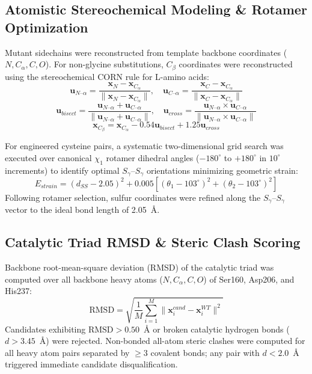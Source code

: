 \documentclass[journal=natcat,manuscript=article]{achemso}
\begin{document}
\subsection{Atomistic Stereochemical Modeling \& Rotamer Optimization}
Mutant sidechains were reconstructed from template backbone coordinates ($N, C_\alpha, C, O$). For non-glycine substitutions, $C_\beta$ coordinates were reconstructed using the stereochemical CORN rule for L-amino acids:
\begin{equation}
\mathbf{u}_{N\text{--}\alpha} = \frac{\mathbf{x}_N - \mathbf{x}_{C_\alpha}}{\|\mathbf{x}_N - \mathbf{x}_{C_\alpha}\|}, \quad \mathbf{u}_{C\text{--}\alpha} = \frac{\mathbf{x}_C - \mathbf{x}_{C_\alpha}}{\|\mathbf{x}_C - \mathbf{x}_{C_\alpha}\|}
\end{equation}
\begin{equation}
\mathbf{u}_{bisect} = \frac{\mathbf{u}_{N\text{--}\alpha} + \mathbf{u}_{C\text{--}\alpha}}{\|\mathbf{u}_{N\text{--}\alpha} + \mathbf{u}_{C\text{--}\alpha}\|}, \quad \mathbf{u}_{cross} = \frac{\mathbf{u}_{N\text{--}\alpha} \times \mathbf{u}_{C\text{--}\alpha}}{\|\mathbf{u}_{N\text{--}\alpha} \times \mathbf{u}_{C\text{--}\alpha}\|}
\end{equation}
\begin{equation}
\mathbf{x}_{C_\beta} = \mathbf{x}_{C_\alpha} - 0.54 \mathbf{u}_{bisect} + 1.25 \mathbf{u}_{cross}
\end{equation}

For engineered cysteine pairs, a systematic two-dimensional grid search was executed over canonical $\chi_1$ rotamer dihedral angles ($-180^\circ$ to $+180^\circ$ in $10^\circ$ increments) to identify optimal $S_\gamma\text{--}S_\gamma$ orientations minimizing geometric strain:
\begin{equation}
E_{strain} = (d_{SS} - 2.05)^2 + 0.005 [(\theta_1 - 103^\circ)^2 + (\theta_2 - 103^\circ)^2]
\end{equation}
Following rotamer selection, sulfur coordinates were refined along the $S_\gamma\text{--}S_\gamma$ vector to the ideal bond length of 2.05~\AA{}.

\subsection{Catalytic Triad RMSD \& Steric Clash Scoring}
Backbone root-mean-square deviation (RMSD) of the catalytic triad was computed over all backbone heavy atoms ($N, C_\alpha, C, O$) of Ser160, Asp206, and His237:
\begin{equation}
\text{RMSD} = \sqrt{\frac{1}{M} \sum_{i=1}^M \|\mathbf{x}_i^{cand} - \mathbf{x}_i^{WT}\|^2}
\end{equation}
Candidates exhibiting $\text{RMSD} > 0.50$~\AA{} or broken catalytic hydrogen bonds ($d > 3.45$~\AA{}) were rejected. Non-bonded all-atom steric clashes were computed for all heavy atom pairs separated by $\ge 3$ covalent bonds; any pair with $d < 2.0$~\AA{} triggered immediate candidate disqualification.
\end{document}
